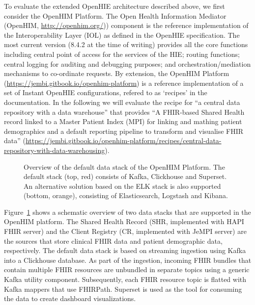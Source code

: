 \documentclass[
  authoryear]{elsarticle}
\begin{document}
To evaluate the extended OpenHIE architecture described above, we first
consider the OpenHIM Platform. The Open Health Information Mediator
(OpenHIM, \href{OpenHIMhttp://openhim.org/}{http://openhim.org/}))
component is the reference implementation of the Interoperability Layer
(IOL) as defined in the OpenHIE specification. The most current version
(8.4.2 at the time of writing) provides all the core functions including
central point of access for the services of the HIE; routing functions;
central logging for auditing and debugging purposes; and
orchestration/mediation mechanisms to co-ordinate requests. By
extension, the OpenHIM Platform
(\url{https://jembi.gitbook.io/openhim-platform}) is a reference
implementation of a set of Instant OpenHIE configurations, refered to as
`recipes' in the documentation. In the following we will evaluate the
recipe for ``a central data repository with a data warehouse'' that
provides ``A FHIR-based Shared Health record linked to a Master Patient
Index (MPI) for linking and mathing patient demographics and a default
reporting pipeline to transform and visualise FHIR data''
(\url{https://jembi.gitbook.io/openhim-platform/recipes/central-data-repository-with-data-warehousing}).

\begin{figure}


\caption{\label{fig-openhim-platform}Overview of the default data stack
of the OpenHIM Platform. The default stack (top, red) consists of Kafka,
Clickhouse and Superset. An alternative solution based on the ELK stack
is also supported (bottom, orange), consisting of Elasticsearch,
Logstash and Kibana.}

\end{figure}%

Figure~\ref{fig-openhim-platform} shows a schematic overview of two data
stacks that are supported in the OpenHIM platform. The Shared Health
Record (SHR, implemented with HAPI FHIR server) and the Client Registry
(CR, implemented with JeMPI server) are the sources that store clinical
FHIR data and patient demographic data, respectively. The default data
stack is based on streaming ingestion using Kafka into a Clickhouse
database. As part of the ingestion, incoming FHIR bundles that contain
multiple FHIR resources are unbundled in separate topics using a generic
Kafka utility component. Subsequently, each FHIR resource topic is
flatted with Kafka mappers that use FHIRPath. Superset is used as the
tool for consuming the data to create dashboard visualizations.
\end{document}
